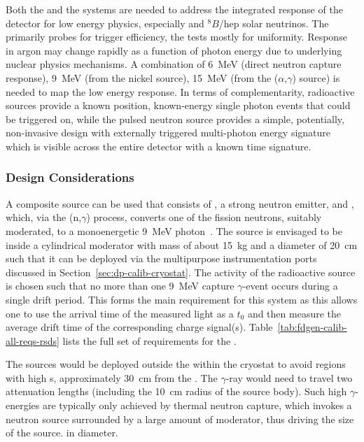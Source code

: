 Both the  and the  systems are needed to address the integrated response of the detector for low energy physics, especially  and $^{8}B$/hep solar neutrinos. 
The  primarily probes for trigger efficiency, the  tests mostly for uniformity. Response in argon may change rapidly as a function of photon energy due to underlying nuclear physics mechanisms. A combination of \SI{6}{\MeV} (direct neutron capture response), \SI{9}{\MeV} (from the nickel source),
\SI{15}{\MeV} (from the ($\alpha$,$\gamma$) source)
is needed to map the low energy response. In terms of complementarity, radioactive sources provide a known position, known-energy single photon events that could be triggered on, while the pulsed neutron source provides a simple, potentially, non-invasive design with externally triggered multi-photon energy signature which is visible across the entire detector with a known time signature.


\subsubsection{Design Considerations}

A composite source can be used that consists of , a strong neutron emitter, and , which, via the (n,$\gamma$) process, converts one of the 
 fission neutrons, suitably moderated, to a monoenergetic \SI{9}{\MeV} photon~\cite{Rogers:1996ks}. 
The source is envisaged to be inside a cylindrical moderator with mass of about \SI{15}{\kg} and a diameter of \SI{20}{\cm} such that it can be deployed via the multipurpose instrumentation ports discussed in Section~\ref{sec:dp-calib-cryostat}. The activity of the radioactive source is chosen such that no more than one \SI{9}{\MeV} capture $\gamma$-event occurs during a single drift period. This forms the main requirement for this system as this allows one to use the arrival time of the measured light as a $t_0$ and then measure the average drift time of the corresponding charge signal(s). Table~\ref{tab:fdgen-calib-all-reqs-rsds} lists the full set of requirements for the .

The sources would be deployed outside the  within the cryostat to avoid regions with high \efield{}s, approximately \SI{30}{\cm} from the . The $\gamma$-ray would need to travel two attenuation lengths (including the \SI{10}{\cm} radius of the source body). Such high $\gamma$-energies are typically only achieved by thermal neutron capture, which invokes a neutron source surrounded by a large amount of moderator, thus driving the size of the source.
in diameter. 

